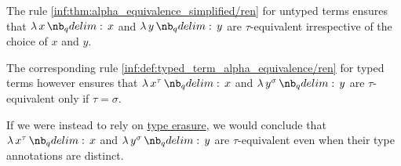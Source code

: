\begin{example}\label{ex:def:typed_term_alpha_equivalence}
  The rule \ref{inf:thm:alpha_equivalence_simplified/ren} for untyped terms ensures that \( \qabs x x \) and \( \qabs y y \) are \( \tau \)-equivalent irrespective of the choice of \( x \) and \( y \).

  The corresponding rule \ref{inf:def:typed_term_alpha_equivalence/ren} for typed terms however ensures that \( \qabs {x^\tau} x \) and \( \qabs {y^\sigma} y \) are \( \tau \)-equivalent only if \( \tau = \sigma \).

  If we were instead to rely on \hyperref[alg:type_erasure]{type erasure}, we would conclude that \( \qabs {x^\tau} x \) and \( \qabs {y^\sigma} y \) are \( \tau \)-equivalent even when their type annotations are distinct.
\end{example}

